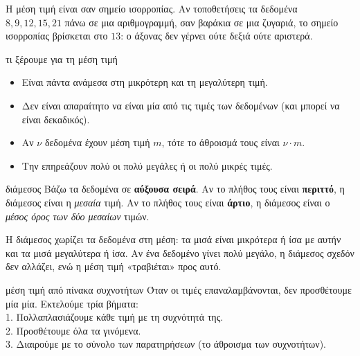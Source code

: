 Η μέση τιμή είναι σαν σημείο ισορροπίας. Αν τοποθετήσεις τα δεδομένα $8, 9, 12, 15, 21$ πάνω σε μια αριθμογραμμή, σαν βαράκια σε μια ζυγαριά, το σημείο ισορροπίας βρίσκεται στο $13$: ο άξονας δεν γέρνει ούτε δεξιά ούτε αριστερά.

\begin{center}
\end{center}

\begin{idiotita}{τι ξέρουμε για τη μέση τιμή}
\begin{itemize}[leftmargin=1.2em,itemsep=0.3ex,topsep=2pt]
\item Είναι πάντα ανάμεσα στη μικρότερη και τη μεγαλύτερη τιμή.
\item Δεν είναι απαραίτητο να είναι μία από τις τιμές των δεδομένων (και μπορεί να είναι δεκαδικός).
\item Αν $\nu$ δεδομένα έχουν μέση τιμή $m$, τότε το άθροισμά τους είναι $\nu\cdot m$.
\item Την επηρεάζουν πολύ οι πολύ μεγάλες ή οι πολύ μικρές τιμές.
\end{itemize}
\end{idiotita}

\begin{kanonas}{διάμεσος}
Βάζω τα δεδομένα σε \textbf{αύξουσα σειρά}. Αν το πλήθος τους είναι \textbf{περιττό}, η διάμεσος είναι η \emph{μεσαία} τιμή. Αν το πλήθος τους είναι \textbf{άρτιο}, η διάμεσος είναι ο \emph{μέσος όρος των δύο μεσαίων} τιμών.
\end{kanonas}

Η διάμεσος χωρίζει τα δεδομένα στη μέση: τα μισά είναι μικρότερα ή ίσα με αυτήν και τα μισά μεγαλύτερα ή ίσα. Αν ένα δεδομένο γίνει πολύ μεγάλο, η διάμεσος σχεδόν δεν αλλάζει, ενώ η μέση τιμή «τραβιέται» προς αυτό.

\begin{kanonas}{μέση τιμή από πίνακα συχνοτήτων}
Όταν οι τιμές επαναλαμβάνονται, δεν προσθέτουμε μία μία. Εκτελούμε τρία βήματα:\\
1. Πολλαπλασιάζουμε κάθε τιμή με τη συχνότητά της.\\
2. Προσθέτουμε όλα τα γινόμενα.\\
3. Διαιρούμε με το σύνολο των παρατηρήσεων (το άθροισμα των συχνοτήτων).
\end{kanonas}

